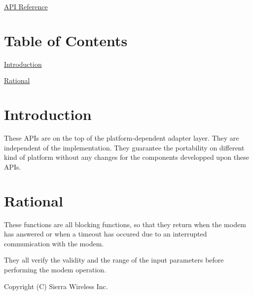 \hyperlink{pa__mcc_8h}{A\+PI Reference}



\hypertarget{c_pa_mcc_pa_mcc_toc}{}\section{Table of Contents}\label{c_pa_mcc_pa_mcc_toc}

\begin{DoxyItemize}
\item \hyperlink{c_pa_mcc_pa_mcc_intro}{Introduction}
\item \hyperlink{c_pa_mcc_pa_mcc_rational}{Rational}
\end{DoxyItemize}\hypertarget{c_pa_mcc_pa_mcc_intro}{}\section{Introduction}\label{c_pa_mcc_pa_mcc_intro}
These A\+P\+Is are on the top of the platform-\/dependent adapter layer. They are independent of the implementation. They guarantee the portability on different kind of platform without any changes for the components developped upon these A\+P\+Is.\hypertarget{c_pa_mcc_pa_mcc_rational}{}\section{Rational}\label{c_pa_mcc_pa_mcc_rational}
These functions are all blocking functions, so that they return when the modem has answered or when a timeout has occured due to an interrupted communication with the modem.

They all verify the validity and the range of the input parameters before performing the modem operation.





Copyright (C) Sierra Wireless Inc. 